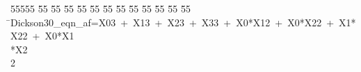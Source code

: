 %
%
\begin{tabbing}
55555 \= 55 \= 55 \= 55 \= 55 \= 55 \= 55 \= 55 \= 55 \= 55 \= 55 \= 55 \= 55 \= \>Dickson30\_eqn\_af=X03\ +\ X13\ +\ X23\ +\ X33\ +\ X0*X12\ +\ X0*X22\ +\ X1*X22\ +\ X0*X1\\[0pt]
\>*X2\\[0pt]
2\>\end{tabbing}
